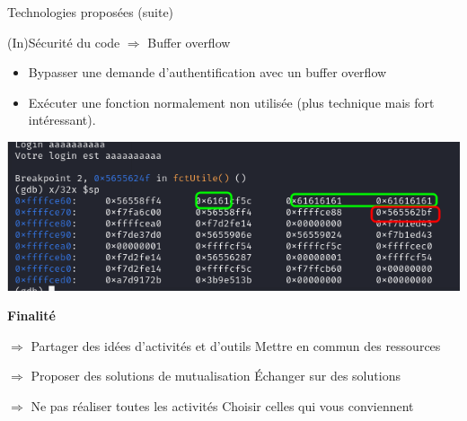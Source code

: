 \documentclass[12pt, handout]{beamer}
\begin{document}
\begin{frame}{Technologies proposées (suite)}

\begin{block}{(In)Sécurité du code $\Rightarrow$ Buffer overflow}
\begin{itemize}
\item Bypasser une demande d'authentification avec un buffer overflow
\item Exécuter une fonction normalement non utilisée (plus technique mais fort intéressant). 
\end{itemize}
\end{block}


\begin{center}
\includegraphics[scale=0.4]{./ressource/dump_mem.png}
\end{center}

\end{frame}



\begin{frame}{\textbf{Finalité}}
\begin{block}{\Large $\Rightarrow$ Partager des idées d'activités et d'outils}
    \small Mettre en commun des ressources 
\end{block}

\begin{block}{\Large $\Rightarrow$ Proposer des solutions de mutualisation}
    \small Échanger sur des solutions 
\end{block}

\begin{alertblock}{\Large $\Rightarrow$ Ne pas réaliser toutes les activités}
    \small Choisir celles qui vous conviennent
\end{alertblock}
\end{frame}
\end{document}
